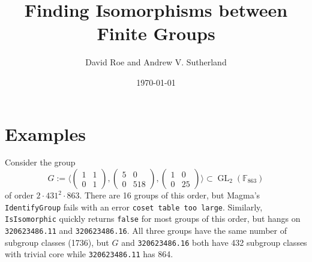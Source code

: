 \documentclass{article}
\title{Finding Isomorphisms between Finite Groups}
\author{David Roe and Andrew V. Sutherland}
\date{\today}
\newcommand{\gid}[2]{\texttt{#1.#2}}
\newcommand{\FF}{\mathbb{F}}
\DeclareMathOperator{\GL}{GL}
\begin{document}
\maketitle

\section{Examples}

Consider the group
$$G := \langle \begin{pmatrix} 1 & 1 \\ 0 & 1 \end{pmatrix}, \begin{pmatrix} 5 & 0 \\ 0 & 518 \end{pmatrix}, \begin{pmatrix} 1 & 0 \\ 0 & 25 \end{pmatrix} \rangle \subset \GL_2(\FF_{863})$$
of order $2 \cdot 431^2 \cdot 863$.  There are 16 groups of this order, but Magma's \texttt{IdentifyGroup} fails with an error \texttt{coset table too large}.  Similarly, \texttt{IsIsomorphic} quickly returns \texttt{false} for most groups of this order, but hangs on \gid{320623486}{11} and \gid{320623486}{16}.  All three groups have the same number of subgroup classes (1736), but $G$ and \gid{320623486}{16} both have 432 subgroup classes with trivial core while \gid{320623486}{11} has 864.
\end{document}
